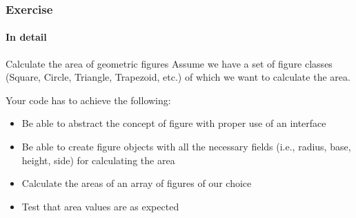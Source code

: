 \begin{frame}
\frametitle{Exercise}
\framesubtitle{In detail}

\begin{block}{Calculate the area of geometric figures}
Assume we have a set of figure classes (Square, Circle, Triangle, Trapezoid, etc.) of which we want to calculate the area.
\end{block}
\pause
\begin{block}{Your code has to achieve the following:}
\begin{itemize}
\item Be able to abstract the concept of figure with proper use of an interface
\item Be able to create figure objects with all the necessary fields (i.e., radius, base, height, side) for calculating the area
\item Calculate the areas of an array of figures of our choice
\item Test that area values are as expected
\end{itemize}
\end{block}

\end{frame}
